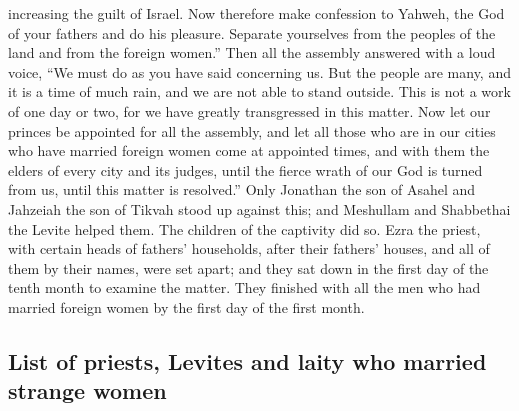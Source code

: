increasing the guilt of Israel.  Now therefore make
confession to Yahweh, the God of your fathers and do his pleasure.
Separate yourselves from the peoples of the land and from the foreign
women.''  Then all the assembly answered with a loud
voice, ``We must do as you have said concerning us.  But
the people are many, and it is a time of much rain, and we are not able
to stand outside. This is not a work of one day or two, for we have
greatly transgressed in this matter.  Now let our princes
be appointed for all the assembly, and let all those who are in our
cities who have married foreign women come at appointed times, and with
them the elders of every city and its judges, until the fierce wrath of
our God is turned from us, until this matter is resolved.''
 Only Jonathan the son of Asahel and Jahzeiah the son of
Tikvah stood up against this; and Meshullam and Shabbethai the Levite
helped them.  The children of the captivity did so. Ezra
the priest, with certain heads of fathers' households, after their
fathers' houses, and all of them by their names, were set apart; and
they sat down in the first day of the tenth month to examine the matter.
 They finished with all the men who had married foreign
women by the first day of the first month.

\hypertarget{list-of-priests-levites-and-laity-who-married-strange-women}{%
\subsection{List of priests, Levites and laity who married strange
women}\label{list-of-priests-levites-and-laity-who-married-strange-women}}


